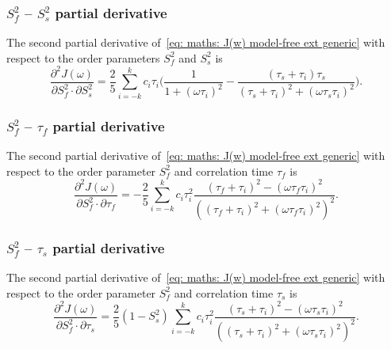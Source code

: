 \subsubsection{$S^2_f$ -- $S^2_s$ partial derivative}

The second partial derivative of~\eqref{eq: maths: J(w) model-free ext generic} with respect to the order parameters $S^2_f$ and $S^2_s$ is
\begin{equation}
    \frac{\partial^2 J(\omega)}{\partial S^2_f \cdot \partial S^2_s} = \frac{2}{5} \sum_{i=-k}^k c_i \tau_i \Bigg(
        \frac{1}{1 + (\omega \tau_i)^2}
        - \frac{(\tau_s + \tau_i)\tau_s}{(\tau_s + \tau_i)^2 + (\omega \tau_s \tau_i)^2}
    \Bigg).
\end{equation}



\subsubsection{$S^2_f$ -- $\tau_f$ partial derivative}

The second partial derivative of~\eqref{eq: maths: J(w) model-free ext generic} with respect to the order parameter $S^2_f$ and correlation time $\tau_f$ is
\begin{equation}
    \frac{\partial^2 J(\omega)}{\partial S^2_f \cdot \partial \tau_f} = -\frac{2}{5} \sum_{i=-k}^k c_i \tau_i^2
        \frac{(\tau_f + \tau_i)^2 - (\omega \tau_f \tau_i)^2}{\left((\tau_f + \tau_i)^2 + (\omega \tau_f \tau_i)^2 \right)^2}.
\end{equation}



\subsubsection{$S^2_f$ -- $\tau_s$ partial derivative}

The second partial derivative of~\eqref{eq: maths: J(w) model-free ext generic} with respect to the order parameter $S^2_f$ and correlation time $\tau_s$ is
\begin{equation}
    \frac{\partial^2 J(\omega)}{\partial S^2_f \cdot \partial \tau_s} = \frac{2}{5} (1 - S^2_s) \sum_{i=-k}^k c_i \tau_i^2
        \frac{(\tau_s + \tau_i)^2 - (\omega \tau_s \tau_i)^2}{\left((\tau_s + \tau_i)^2 + (\omega \tau_s \tau_i)^2 \right)^2}.
\end{equation}



